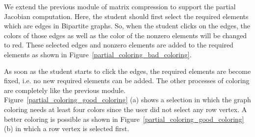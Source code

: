 \documentclass[12pt, twoside,a4paper,toc=bibliography]{scrbook}
\begin{document}
We extend the previous module of matrix compression to support
the partial Jacobian computation. Here, the student should
first select the required elements which are edges in Bipartite graphs.
So, when the student clicks on the edges, the colors of those edges 
as well as the color of the nonzero elements will be changed to red.
These selected edges and nonzero elements are added to the required elements
as shown in Figure~\ref{partial_coloring_bad_coloring}.

As soon as the student starts to click the edges, the required elements
are become fixed, i.e. no new required elements can be added.
The other processes of coloring are completely like the previous module.
Figure~\ref{partial_coloring_good_coloring} (a) shows a selection in which the graph coloring
needs at least four colors since the user did not select any row vertex.
A better coloring is possible as shown in Figure~\ref{partial_coloring_good_coloring} (b)
in which a row vertex is selected first.
\end{document}
